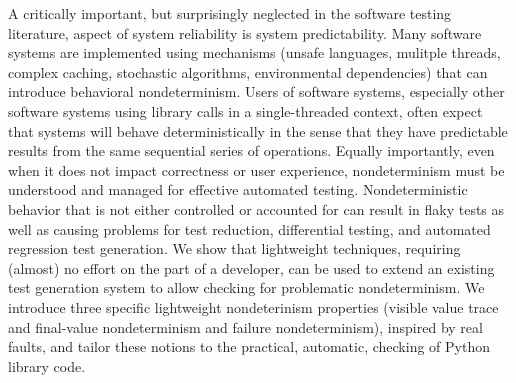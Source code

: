 A critically important, but surprisingly neglected in the software testing literature, aspect of system reliability is system predictability.  Many software systems are implemented using mechanisms (unsafe languages, mulitple threads, complex caching, stochastic algorithms, environmental dependencies) that can introduce behavioral nondeterminism.  Users of software systems, especially other software systems using library calls in a single-threaded context, often expect that systems will behave deterministically in the sense that they have predictable results from the same sequential series of operations.  Equally importantly, even when it does not impact correctness or user experience, nondeterminism must be understood and managed for effective automated testing.  Nondeterministic behavior that is not either controlled or accounted for can result in flaky tests as well as causing problems for test reduction, differential testing, and automated regression test generation.  We show that lightweight techniques, requiring (almost) no effort on the part of a developer, can be used to extend an existing test generation system to allow checking for problematic nondeterminism.  We introduce three specific lightweight nondeterinism properties (visible value trace and final-value nondeterminism and failure nondeterminism), inspired by real faults, and tailor these notions to the practical, automatic, checking of Python library code.